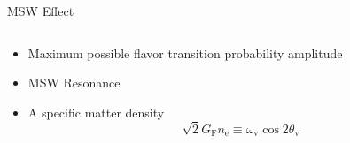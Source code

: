 \documentclass[9pt]{beamer}
\begin{document}
\begin{darkframes}
\begin{frame}{MSW Effect}
{\begin{columns}[T]
\begin{column}{0.5\textwidth}
\begin{itemize}
\item
Maximum possible flavor transition probability amplitude
\item
MSW Resonance
\item
A specific matter density
\begin{equation*}
    \sqrt{2}G_{\mathrm F}n_{\mathrm e} \equiv \omega_{\mathrm v}\cos 2\theta_{\mathrm v}
\end{equation*}


\end{itemize}









\end{column}
\end{columns}


}




\end{frame}








\end{darkframes}
\end{document}
